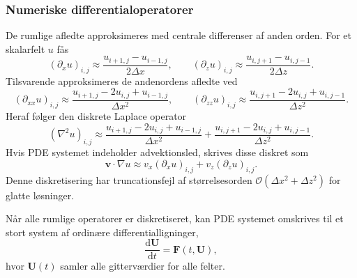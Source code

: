 \subsubsection{Numeriske differentialoperatorer}
De rumlige afledte approksimeres med centrale differenser af anden orden. For et skalarfelt $u$ fås
\begin{equation}
    \left(\partial_x u\right)_{i,j}
    \approx
    \frac{u_{i+1,j}-u_{i-1,j}}{2\Delta x},
    \qquad
    \left(\partial_z u\right)_{i,j}
    \approx
    \frac{u_{i,j+1}-u_{i,j-1}}{2\Delta z}.
    \label{eq:central_first_order}
\end{equation}
Tilsvarende approksimeres de andenordens afledte ved
\begin{equation}
    \left(\partial_{xx} u\right)_{i,j}
    \approx
    \frac{u_{i+1,j}-2u_{i,j}+u_{i-1,j}}{\Delta x^2},
    \qquad
    \left(\partial_{zz} u\right)_{i,j}
    \approx
    \frac{u_{i,j+1}-2u_{i,j}+u_{i,j-1}}{\Delta z^2}.
    \label{eq:central_second_order}
\end{equation}
Heraf følger den diskrete Laplace operator
\[
    (\nabla^2 u)_{i,j}
    \approx
    \frac{u_{i+1,j}-2u_{i,j}+u_{i-1,j}}{\Delta x^2}
    +
    \frac{u_{i,j+1}-2u_{i,j}+u_{i,j-1}}{\Delta z^2}.
\]
Hvis PDE systemet indeholder advektionsled, skrives disse diskret som
\[
    \mathbf{v}\cdot\nabla u
    \approx
    v_x \left(\partial_x u\right)_{i,j}
    +
    v_z \left(\partial_z u\right)_{i,j}.
\]
Denne diskretisering har truncationsfejl af størrelsesorden $\mathcal{O}(\Delta x^2+\Delta z^2)$ for glatte løsninger.

Når alle rumlige operatorer er diskretiseret, kan PDE systemet omskrives til et stort system af ordinære differentialligninger,
\begin{equation}
    \frac{\mathrm{d}\mathbf{U}}{\mathrm{d}t} = \mathbf{F}(t,\mathbf{U}),
    \label{eq:mol_system}
\end{equation}
hvor $\mathbf{U}(t)$ samler alle gitterværdier for alle felter.

